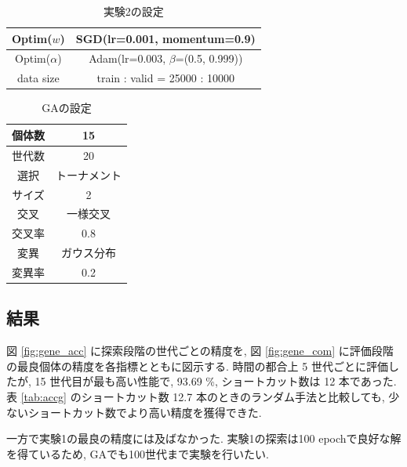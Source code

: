 \documentclass[twocolumn]{jarticle}     %
\begin{document}
\begin{table}[t]
  \begin{center}
    \caption{実験2の設定}
    \begin{tabular}{|c|c|} \hline
      Optim($w$) & SGD(lr=0.001, momentum=0.9) \\ \hline
      Optim($\alpha$) & Adam(lr=0.003, $\beta$=(0.5, 0.999)) \\ \hline
      data size & train : valid = 25000 : 10000 \\ \hline
    \end{tabular}
    \label{tab:setting2}
  \end{center}
\end{table}

\begin{table}[t]
  \begin{center}
    \caption{GAの設定}
    \begin{tabular}{|c|c|} \hline
      個体数 & 15 \\ \hline
      世代数 & 20 \\ \hline \hline
      選択 & トーナメント \\ \hline
      サイズ & 2 \\ \hline \hline
      交叉 & 一様交叉 \\ \hline
      交叉率 & 0.8 \\ \hline \hline
      変異 & ガウス分布 \\ \hline
      変異率 & 0.2 \\ \hline
    \end{tabular}
    \label{tab:setting_ga}
  \end{center}
\end{table}


\subsection{結果}
図 \ref{fig:gene_acc} に探索段階の世代ごとの精度を,
図 \ref{fig:gene_com} に評価段階の最良個体の精度を各指標とともに図示する.
時間の都合上 5 世代ごとに評価したが, 15 世代目が最も高い性能で,
93.69 \%, ショートカット数は 12 本であった.
表 \ref{tab:accg} のショートカット数 12.7 本のときのランダム手法と比較しても, 少ないショートカット数でより高い精度を獲得できた.

一方で実験1の最良の精度には及ばなかった. 実験1の探索は100 epochで良好な解を得ているため, GAでも100世代まで実験を行いたい.
\end{document}
